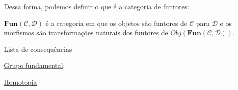 Dessa forma, podemos definir o que é a categoria de funtores: 

$\mathbf{Fun(\mathcal{C}, \mathcal{D})}$ é a categoria em que os objetos são funtores de $\mathcal{C}$ para $\mathcal{D}$ e os morfismos são transformações naturais dos funtores de $Obj(\mathbf{Fun(\mathcal{C}, \mathcal{D})})$.

\begin{titlemize}{Lista de consequências}
	\item \hyperref[grupo-fundamental]{Grupo fundamental};\\ %
	\item \hyperref[homotopia]{Homotopia}
\end{titlemize}

